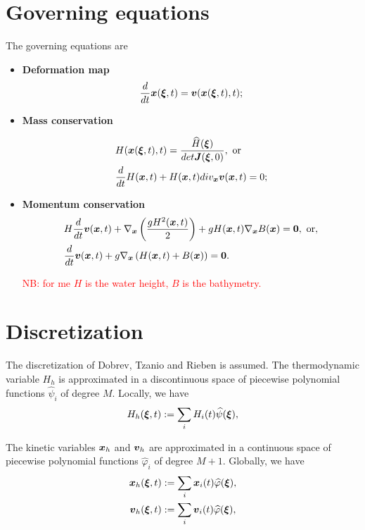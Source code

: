 \documentclass[english]{article}
\theoremstyle{thmstyleone}
\theoremstyle{thmstyletwo}
\theoremstyle{thmstylethree}
\newcommand{\uvec}[2][3]{\boldsymbol{#2\mkern-#1mu}\mkern#1mu}
\newcommand{\hpsi}{\widehat{\psi}}
\newcommand{\hphi}{\widehat{\varphi}}
\begin{document}
\section{Governing equations}
The governing equations are
\begin{itemize}
\item \textbf{Deformation map}
\begin{equation}
\frac{d}{dt}\uvec{x}(\uvec{\xi},t)=\uvec{v}(\uvec{x}(\uvec{\xi},t),t);
\end{equation}

\item \textbf{Mass conservation}

\begin{align}
&H(\uvec{x}(\uvec{\xi},t),t)=\frac{\widehat{H}(\uvec{\xi})}{det \uvec{J}(\uvec{\xi},0)} ,\text{ or} \label{eq:strong_mass_conservation}\\
&\frac{d}{dt}H(\uvec{x},t)+H(\uvec{x},t)div_{\uvec{x}}\uvec{v}(\uvec{x},t)=0; \label{eq:weak_mass_conservation}
\end{align}

\item \textbf{Momentum conservation}
\begin{align}
&H\frac{d}{dt}\uvec{v}(\uvec{x},t)+\nabla_{\uvec{x}}\left(\frac{gH^2(\uvec{x},t)}{2}\right)+gH(\uvec{x},t)\nabla_{\uvec{x}}B(\uvec{x})=\uvec{0} ,\text{ or}, \label{eq:momentum_non_wb}\\
&\frac{d}{dt}\uvec{v}(\uvec{x},t)+g\nabla_{\uvec{x}}\left(H(\uvec{x},t)+B(\uvec{x})\right)=\uvec{0}. \label{eq:momentum_wb}
\end{align}


\textcolor{red}{NB: for me $H$ is the water height, $B$ is the bathymetry.}



\end{itemize}


\section{Discretization}
The discretization of Dobrev, Tzanio and Rieben is assumed.
The thermodynamic variable $H_h$ is approximated in a discontinuous space of piecewise polynomial functions $\hpsi_i$ of degree $M$. Locally, we have
\begin{equation}
H_h(\uvec{\xi},t):=\sum_{i}H_i(t)\hpsi(\uvec{\xi}),
\end{equation}

The kinetic variables $\uvec{x}_h$ and $\uvec{v}_h$ are approximated in a continuous space of piecewise polynomial functions $\hphi_i$ of degree $M+1$. Globally, we have
\begin{align}
\uvec{x}_h(\uvec{\xi},t)&:=\sum_{i}\uvec{x}_i(t)\hphi(\uvec{\xi}),\\
\uvec{v}_h(\uvec{\xi},t)&:=\sum_{i}\uvec{v}_i(t)\hphi(\uvec{\xi}),
\end{align}
\end{document}
